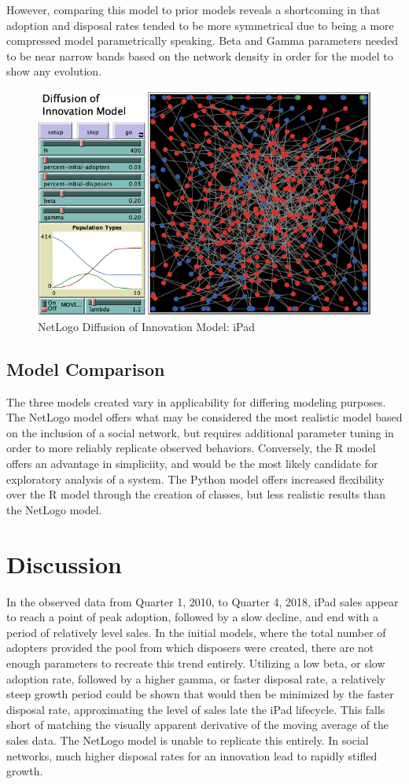 \documentclass[11pt]{article}
\begin{document}
However, comparing this model to prior models reveals a shortcoming in that adoption and disposal rates tended to be more symmetrical due to being a more compressed model parametrically speaking. Beta and Gamma parameters needed to be near narrow bands based on the network density in order for the model to show any evolution. 
\begin{figure}[h!]
	\centering
	\includegraphics[width=0.7\linewidth]{Diffusion_NetLogo.png}
	\caption{NetLogo Diffusion of Innovation Model: iPad}
	\label{fig:Diffusion_NetLogo}
\end{figure}

\subsection{Model Comparison}
The three models created vary in applicability for differing modeling purposes. The NetLogo model offers what may be considered the most realistic model based on the inclusion of a social network, but requires additional parameter tuning in order to more reliably replicate observed behaviors. Conversely, the R model offers an advantage in simpliciity, and would be the most likely candidate for exploratory analysis of a system. The Python model offers increased flexibility over the R model through the creation of classes, but less realistic results than the NetLogo model. 




\section{Discussion}

In the observed data from Quarter 1, 2010, to Quarter 4, 2018, iPad sales appear to reach a point of peak adoption, followed by a slow decline, and end with a period of relatively level sales. In the initial models, where the total number of adopters provided the pool from which disposers were created, there are not enough parameters to recreate this trend entirely. Utilizing a low beta, or slow adoption rate, followed by a higher gamma, or faster disposal rate, a relatively steep growth period could be shown that would then be minimized by the faster disposal rate, approximating the level of sales late the iPad lifecycle. This falls short of matching the visually apparent derivative of the moving average of the sales data. The NetLogo model is unable to replicate this entirely. In social networks, much higher disposal rates for an innovation lead to rapidly stifled growth. 
\end{document}
